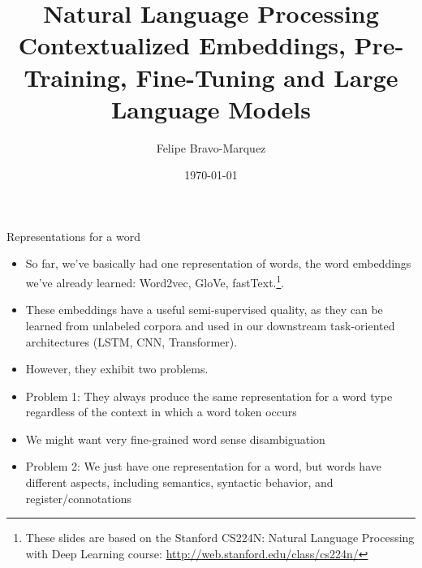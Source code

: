\documentclass[handout]{beamer}
\title{Natural Language Processing \\ Contextualized Embeddings, Pre-Training, Fine-Tuning and Large Language Models}
\author[Felipe Bravo Márquez]{\footnotesize
 \textcolor[rgb]{0.00,0.00,1.00}{Felipe Bravo-Marquez}}
\date{\today}
\begin{document}
\begin{frame}
\titlepage


\end{frame}



\begin{frame}{Representations for a word}
\begin{scriptsize}
\begin{itemize}
\item So far, we've basically had one representation of words, the word embeddings we've already learned:  Word2vec, GloVe, fastText.\footnote{These slides are based on the Stanford CS224N: Natural Language Processing with Deep Learning course: \url{http://web.stanford.edu/class/cs224n/}}.
\item These embeddings have a useful semi-supervised quality, as they can be learned from unlabeled corpora and used in our downstream task-oriented architectures (LSTM, CNN, Transformer).

\item However, they exhibit two problems.
\item  Problem 1: They always produce the same representation for a word type regardless of the context in which a word token occurs
\item  We might want very fine-grained word sense disambiguation
\item Problem 2: We just have one representation for a word, but words have different aspects, including semantics, syntactic behavior, and register/connotations

 

\end{itemize}
\end{scriptsize}
\end{frame}
\end{document}

